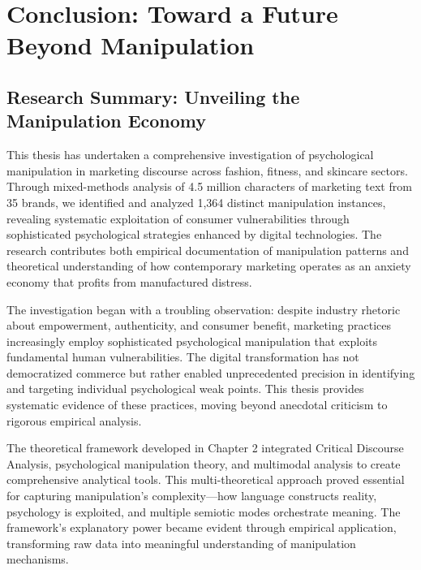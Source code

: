 
\chapter{Conclusion: Toward a Future Beyond Manipulation}
\label{ch:conclusion}

\section{Research Summary: Unveiling the Manipulation Economy}
\label{sec:conclusion_summary}

This thesis has undertaken a comprehensive investigation of psychological manipulation in marketing discourse across fashion, fitness, and skincare sectors. Through mixed-methods analysis of 4.5 million characters of marketing text from 35 brands, we identified and analyzed 1,364 distinct manipulation instances, revealing systematic exploitation of consumer vulnerabilities through sophisticated psychological strategies enhanced by digital technologies. The research contributes both empirical documentation of manipulation patterns and theoretical understanding of how contemporary marketing operates as an anxiety economy that profits from manufactured distress.

The investigation began with a troubling observation: despite industry rhetoric about empowerment, authenticity, and consumer benefit, marketing practices increasingly employ sophisticated psychological manipulation that exploits fundamental human vulnerabilities. The digital transformation has not democratized commerce but rather enabled unprecedented precision in identifying and targeting individual psychological weak points. This thesis provides systematic evidence of these practices, moving beyond anecdotal criticism to rigorous empirical analysis.

The theoretical framework developed in Chapter 2 integrated Critical Discourse Analysis, psychological manipulation theory, and multimodal analysis to create comprehensive analytical tools. This multi-theoretical approach proved essential for capturing manipulation's complexity—how language constructs reality, psychology is exploited, and multiple semiotic modes orchestrate meaning. The framework's explanatory power became evident through empirical application, transforming raw data into meaningful understanding of manipulation mechanisms.

